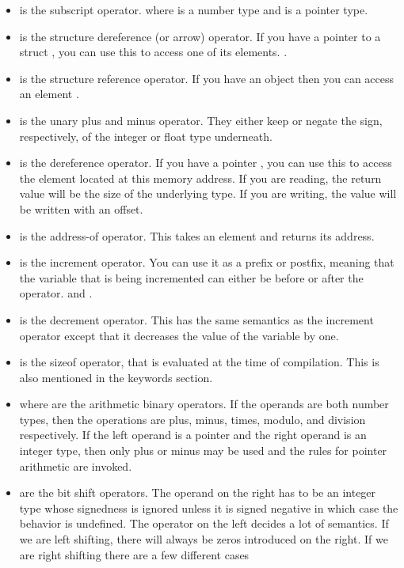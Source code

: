 \begin{itemize}
	\item \keyword{[]} is the subscript operator.  where  is a number type and  is a pointer type.
	\item \keyword{->} is the structure dereference (or arrow) operator. If you have a pointer to a struct , you can use this to access one of its elements. .
	\item {} is the structure reference operator. If you have an object  then you can access an element .
	\item {} is the unary plus and minus operator. They either keep or negate the sign, respectively, of the integer or float type underneath.
	\item {} is the dereference operator. If you have a pointer , you can use this to access the element located at this memory address. If you are reading, the return value will be the size of the underlying type. If you are writing, the value will be written with an offset.
	\item {} is the address-of operator. This takes an element and returns its address.
	\item \keyword{++} is the increment operator. You can use it as a prefix or postfix, meaning that the variable that is being incremented can either be before or after the operator.  and .
	\item \keyword{--} is the decrement operator. This has the same semantics as the increment operator except that it decreases the value of the variable by one.
	\item {} is the sizeof operator, that is evaluated at the time of compilation. This is also mentioned in the keywords section.
	\item {} where  are the arithmetic binary operators. If the operands are both number types, then the operations are plus, minus, times, modulo, and division respectively. If the left operand is a pointer and the right operand is an integer type, then only plus or minus may be used and the rules for pointer arithmetic are invoked.
	\item \keyword{>>/<<} are the bit shift operators. The operand on the right has to be an integer type whose signedness is ignored unless it is signed negative in which case the behavior is undefined. The operator on the left decides a lot of semantics. If we are left shifting, there will always be zeros introduced on the right. If we are right shifting there are a few different cases

\end{itemize}
